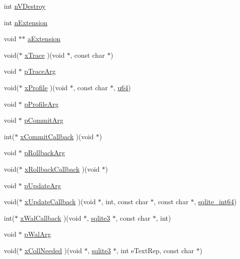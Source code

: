 \begin{DoxyCompactItemize}
\item 
int \hyperlink{structsqlite3_ac9a2a893dae0aec6a1db1311a095bcb8}{n\+V\+Destroy}
\item 
int \hyperlink{structsqlite3_adf858352fa6409a229d7d409b46d06ce}{n\+Extension}
\item 
void $\ast$$\ast$ \hyperlink{structsqlite3_a1052b9fcfc19b54f8d8c16bfcaafe546}{a\+Extension}
\item 
void($\ast$ \hyperlink{structsqlite3_a24970a9fc34aaff93a2a313fcbafafe6}{x\+Trace} )(void $\ast$, const char $\ast$)
\item 
void $\ast$ \hyperlink{structsqlite3_aba68a77cf29ce08cacb16f81a5e4211b}{p\+Trace\+Arg}
\item 
void($\ast$ \hyperlink{structsqlite3_a04b4f4fb5f8692b699a35fbf8d4448f7}{x\+Profile} )(void $\ast$, const char $\ast$, \hyperlink{sqlite3_8c_a0e0cdb443a471891a042a6bfdc4644ca}{u64})
\item 
void $\ast$ \hyperlink{structsqlite3_a0f504ced99e3d7be97f04803ff863723}{p\+Profile\+Arg}
\item 
void $\ast$ \hyperlink{structsqlite3_a41bf104f121d0f25db693beca96d9754}{p\+Commit\+Arg}
\item 
int($\ast$ \hyperlink{structsqlite3_a4e8bad45f834070578c17b7bca681c59}{x\+Commit\+Callback} )(void $\ast$)
\item 
void $\ast$ \hyperlink{structsqlite3_a5c723cc74a5267fccd48787c75570897}{p\+Rollback\+Arg}
\item 
void($\ast$ \hyperlink{structsqlite3_aa214b2f14d2b0d62e8eca478cc693272}{x\+Rollback\+Callback} )(void $\ast$)
\item 
void $\ast$ \hyperlink{structsqlite3_af3c38d0b39a40a6391029bda3724102e}{p\+Update\+Arg}
\item 
void($\ast$ \hyperlink{structsqlite3_adcf4b0946f328cb0c624619d03686c5b}{x\+Update\+Callback} )(void $\ast$, int, const char $\ast$, const char $\ast$, \hyperlink{sqlite3_8c_a520a95f9080c018b2fade39885bd2e2a}{sqlite\+\_\+int64})
\item 
int($\ast$ \hyperlink{structsqlite3_acb709ae5873ab3a583631314ab73c5b4}{x\+Wal\+Callback} )(void $\ast$, \hyperlink{structsqlite3}{sqlite3} $\ast$, const char $\ast$, int)
\item 
void $\ast$ \hyperlink{structsqlite3_a0a4d7d85d57f7f8e186cafea4adfe9f8}{p\+Wal\+Arg}
\item 
void($\ast$ \hyperlink{structsqlite3_a55e017f789c078e72e89c8170cae5a89}{x\+Coll\+Needed} )(void $\ast$, \hyperlink{structsqlite3}{sqlite3} $\ast$, int e\+Text\+Rep, const char $\ast$)
$$
\end{DoxyCompactItemize}
